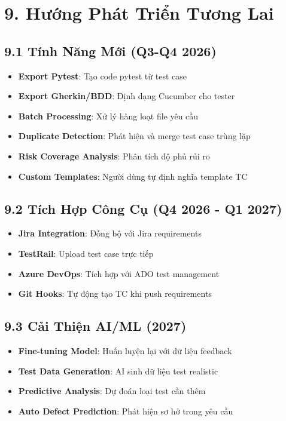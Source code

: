 \documentclass[14pt,a4paper]{article}
\begin{document}
\section{9. Hướng Phát Triển Tương Lai}

\subsection{9.1 Tính Năng Mới (Q3-Q4 2026)}

\begin{itemize}
    \item \textbf{Export Pytest}: Tạo code pytest từ test case
    \item \textbf{Export Gherkin/BDD}: Định dạng Cucumber cho tester
    \item \textbf{Batch Processing}: Xử lý hàng loạt file yêu cầu
    \item \textbf{Duplicate Detection}: Phát hiện và merge test case trùng lặp
    \item \textbf{Risk Coverage Analysis}: Phân tích độ phủ rủi ro
    \item \textbf{Custom Templates}: Người dùng tự định nghĩa template TC
\end{itemize}

\subsection{9.2 Tích Hợp Công Cụ (Q4 2026 - Q1 2027)}

\begin{itemize}
    \item \textbf{Jira Integration}: Đồng bộ với Jira requirements
    \item \textbf{TestRail}: Upload test case trực tiếp
    \item \textbf{Azure DevOps}: Tích hợp với ADO test management
    \item \textbf{Git Hooks}: Tự động tạo TC khi push requirements
\end{itemize}

\subsection{9.3 Cải Thiện AI/ML (2027)}

\begin{itemize}
    \item \textbf{Fine-tuning Model}: Huấn luyện lại với dữ liệu feedback
    \item \textbf{Test Data Generation}: AI sinh dữ liệu test realistic
    \item \textbf{Predictive Analysis}: Dự đoán loại test cần thêm
    \item \textbf{Auto Defect Prediction}: Phát hiện sơ hở trong yêu cầu
\end{itemize}
\end{document}
